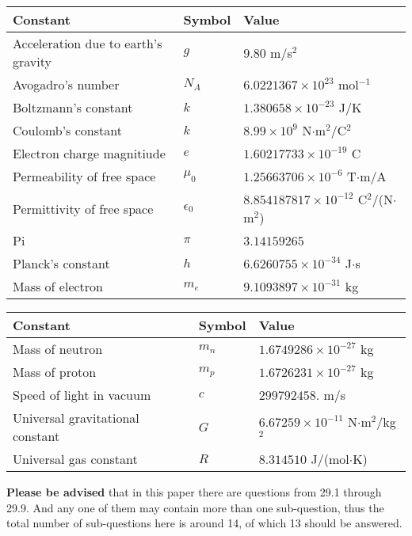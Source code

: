 \documentclass[12pt]{article}
\begin{document}
 
 
\noindent\begin{tabular}{|l|l|l|}
\hline
Constant & Symbol & Value \\
\hline
Acceleration due to earth's gravity &
$g$ &
 $ 9.80 $
m/s$^2$ \\
\hline
Avogadro's number &
$N_A$ &
 $ 6.0221367 \times 10^{23} $
mol$^{-1}$ \\
\hline
Boltzmann's constant &
$k$ &
 $ 1.380658 \times 10^{-23} $
J/K \\
\hline
Coulomb's constant &
$k$ &
 $ 8.99 \times 10^{9} $
N$\cdot $m$^2$/C$^2$ \\
\hline
Electron charge magnitiude &
$e$ &
 $ 1.60217733 \times 10^{-19} $
C \\
\hline
Permeability of free space &
$\mu _0$ &
 $ 1.25663706 \times 10^{-6} $
T$\cdot $m/A \\
\hline
Permittivity of free space &
$\epsilon _0$ &
 $ 8.854187817 \times 10^{-12} $
C$^2$/(N$\cdot $m$^2$) \\
\hline
Pi &
$\pi$ &
 $ 3.14159265 $
$ $ \\
\hline
Planck's constant &
$h$ &
 $ 6.6260755 \times 10^{-34} $
J$\cdot $s \\
\hline
Mass of electron &
$m_e$ &
 $ 9.1093897 \times 10^{-31} $
kg \\
\hline
\end{tabular}
 
 
\noindent\begin{tabular}{|l|l|l|}
\hline
Constant & Symbol & Value \\
\hline
Mass of neutron &
$m_n$ &
 $ 1.6749286 \times 10^{-27} $
kg \\
\hline
Mass of proton &
$m_p$ &
 $ 1.6726231 \times 10^{-27} $
kg \\
\hline
Speed of light in vacuum &
$c$ &
 $ 299792458. $
m/s \\
\hline
Universal gravitational constant &
$G$ &
 $ 6.67259 \times 10^{-11} $
N$\cdot $m$^2$/kg$^2$ \\
\hline
Universal gas constant &
$R$ &
 $ 8.314510 $
J/(mol$\cdot $K) \\
\hline
\end{tabular}
 
 
{\textbf{\large{Please be advised}}} that in this paper there are questions from
29.1 through
29.9.
And any one of them may contain more than one sub-question, thus the total number
of sub-questions here is around 14, of which
13 should be answered.
 
\end{document}

